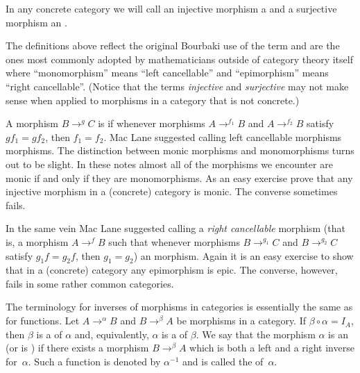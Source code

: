 \begin{defn} In any concrete category we will call an injective morphism a
 and a surjective morphism an
.
\end{defn}

\begin{cau} The definitions above reflect the original Bourbaki use of the term and are the
ones most commonly adopted by mathematicians outside of category theory itself where
``monomorphism'' means ``left cancellable'' and ``epimorphism'' means ``right
cancellable''.  (Notice that the terms \emph{injective} and \emph{surjective} may not
make sense when applied to morphisms in a category that is not concrete.)

A morphism $B \to^g C$ is
 if whenever morphisms $A \to^{f_1} B$ and $A \to^{f_2} B$ satisfy
$gf_1 = gf_2$, then $f_1 = f_2$.  Mac Lane suggested calling left cancellable morphisms
 morphisms.  The distinction between monic morphisms and monomorphisms turns
out to be slight.  In these notes almost all of the morphisms we encounter are monic if
and only if they are monomorphisms. As an easy exercise prove that any injective morphism
in a (concrete) category is monic.  The converse sometimes fails.

In the same vein Mac Lane suggested calling a
\emph{right cancellable} morphism (that is, a morphism $A \to^f B$ such that whenever
morphisms $B \to^{g_1} C$ and $B \to^{g_2} C$ satisfy $g_1f = g_2f$, then $g_1 = g_2$) an
 morphism.  Again it is an easy exercise to show that in a (concrete) category
any epimorphism is epic.  The converse, however, fails in some rather common categories.
\end{cau}

\begin{defn} The terminology for inverses of morphisms in categories is essentially the same
as for functions.  Let $A \to^\alpha B$ and $B \to^\beta A$ be
morphisms in a category. If $\beta \circ \alpha = I_A$, then $\beta$ is a
 of $\alpha$ and, equivalently, $\alpha$ is a
 of $\beta$. We say that the morphism $\alpha$ is an
 (or is
) if there exists a morphism $B \to^\beta A$ which is both a left and a
right inverse for~$\alpha$.  Such a function is denoted by $\alpha^{-1}$ and is called the
 of~$\alpha$.
\end{defn}

